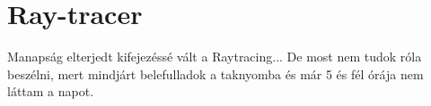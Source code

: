 \section{Ray-tracer}

Manapság elterjedt kifejezéssé vált a Raytracing... De most nem tudok róla beszélni, mert mindjárt belefulladok a taknyomba és már 5 és fél órája nem láttam a napot.